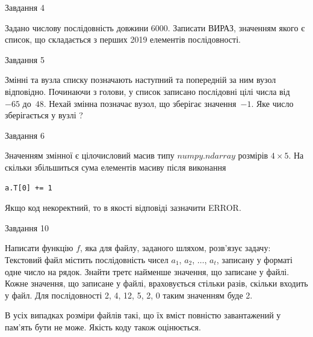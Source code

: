 \documentclass[12pt, ukrainian]{article}
\begin{document}
{               
{\begin{center}Завдання {4}\end{center}}
\vspace{-6mm}

 Задано числову послідовність  довжини 6000. Записати ВИРАЗ, значенням якого є список, що складається з перших 2019 елементів послідовності.\par

\vspace{10mm}
               
{\begin{center}Завдання {5}\end{center}}
\vspace{-6mm}
Змінні  та  вузла списку позначають наступний та попередній за ним вузол відповідно. Починаючи з голови, у список записано послідовні цілі числа від~$-65$ до~$48$. Нехай змінна  позначає вузол, що зберігає значення~$-1$.
Яке число зберігається у вузлі  ?\par

               
{\begin{center}Завдання {6}\end{center}}
\vspace{-6mm}
Значенням змінної  є цілочисловий масив типу $numpy.ndarray$ розмірів $4{\times}5$. На скільки збільшиться сума елементів масиву  після виконання
\begin{verbatim}
a.T[0] += 1
\end{verbatim}


Якщо код некоректний, то в якості відповіді зазначити ERROR.\par

               
{\begin{center}Завдання {10}\end{center}}
\vspace{-6mm}

Написати функцію $f$, яка для файлу, заданого шляхом, розв’язує задачу:\\ Текстовий файл містить послідовність чисел $a_1$, $a_2$, $\ldots$, $a_t$, записану у форматі одне число на рядок. Знайти третє найменше значення, що записане у файлі. Кожне значення, що записане у файлі, враховується стільки разів, скільки входить у файл. Для послідовності 2, 4, 12, 5, 2, 0 таким значенням буде 2.

В усіх випадках розміри файлів такі, що їх вміст повністю завантажений у пам'ять бути не може. Якість коду також оцінюється.



}
\end{document}
